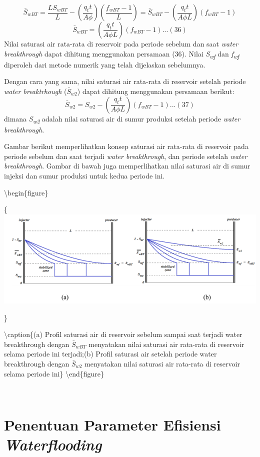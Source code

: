 \documentclass[
]{book}
\begin{document}
\[\bar S_{wBT} = \frac{LS_{wBT}}{L} - \left( \frac{q_tt}{A\phi} \right) \left( \frac{f_{wBT}-1}{L} \right) = \bar S_{wBT} -\left( \frac{q_tt}{A\phi L} \right)(f_{wBT}-1)\]
\[\bar S_{wBT} = \left( \frac{q_tt}{A\phi L} \right)(f_{wBT}-1)...(36)\]
Nilai saturasi air rata-rata di reservoir pada periode sebelum dan saat \emph{water breakthrough} dapat dihitung menggunakan persamaan (36). Nilai \emph{S\textsubscript{wf}} dan \emph{f\textsubscript{wf}} diperoleh dari metode numerik yang telah dijelaskan sebelumnya.

Dengan cara yang sama, nilai saturasi air rata-rata di reservoir setelah periode \emph{water breaktrhough} (\(\bar S_{w2}\)) dapat dihitung menggunakan persamaan berikut:
\[\bar S_{w2} = S_{w2}-\left( \frac{q_tt}{A\phi L} \right)(f_{wBT}-1)...(37)\]
dimana \emph{S\textsubscript{w2}} adalah nilai saturasi air di sumur produksi setelah periode \emph{water breakthrough}.

Gambar berikut memperlihatkan konsep saturasi air rata-rata di reservoir pada periode sebelum dan saat terjadi \emph{water breakthrough}, dan periode setelah \emph{water breakthrough}. Gambar di bawah juga memperlihatkan nilai saturasi air di sumur injeksi dan sumur produksi untuk kedua periode ini.

\textbackslash begin\{figure\}

\{\centering \includegraphics[width=0.75\linewidth]{images/waterflood/saturasi3}

\}

\textbackslash caption\{(a) Profil saturasi air di reservoir sebelum sampai saat terjadi water breakthrough dengan \textbf{\(\bar S_{wBT}\)} menyatakan nilai saturasi air rata-rata di reservoir selama periode ini terjadi;(b) Profil saturasi air setelah periode water breakthrough dengan \textbf{\(\bar S_{w2}\)} menyatakan nilai saturasi air rata-rata di reservoir selama periode ini\}\label{fig:unnamed-chunk-51}
\textbackslash end\{figure\}

~

\hypertarget{penentuan-parameter-efisiensi-waterflooding}{%
\section{\texorpdfstring{Penentuan Parameter Efisiensi \emph{Waterflooding}}{Penentuan Parameter Efisiensi Waterflooding}}\label{penentuan-parameter-efisiensi-waterflooding}}
\end{document}
